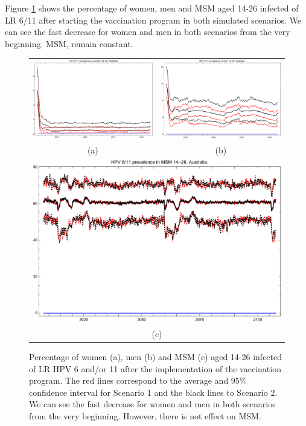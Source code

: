 Figure \ref{fig:prev_AUS_6_11} shows the percentage of women, men and MSM aged 14-26 infected of LR 6/11 after starting the vaccination program in both simulated scenarios. We can see the fast decrease for women and men in both scenarios from the very beginning. MSM, remain constant. 

\begin{figure}[!]
	\centering
	\begin{tabular}{cc}
		\includegraphics[width=0.5\linewidth]{IMGs/3.-Australia/Retr_muj_14_26_verr_Australia.pdf}	& 
		\includegraphics[width=0.5\linewidth]{IMGs/3.-Australia/Retr_hom_14_26_verr_Australia.pdf}  \\ 
		(a)	& (b) \\ 
		\multicolumn{2}{c}{ \includegraphics[width=0.5\linewidth]{IMGs/3.-Australia/Retr_MSM_14_26_verr_Australia.pdf} } \\ 
		\multicolumn{2}{c}{(c)} \\ 
	\end{tabular} 
	\caption{Percentage of women (a), men (b) and MSM (c) aged 14-26 infected of LR HPV 6 and/or 11 after the implementation of the vaccination program. The red lines correspond to the average and $95\%$ confidence interval for Scenario 1 and the black lines to Scenario 2.  We can see the fast decrease for women and men in both scenarios from the very beginning. However, there is not effect on MSM.}
	\label{fig:prev_AUS_6_11}	
\end{figure}

